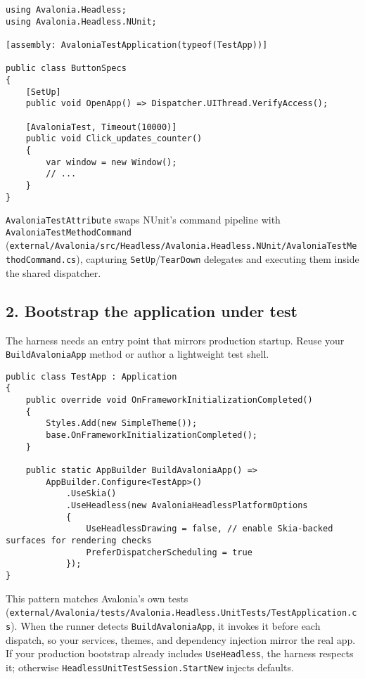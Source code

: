 \begin{lstlisting}
using Avalonia.Headless;
using Avalonia.Headless.NUnit;

[assembly: AvaloniaTestApplication(typeof(TestApp))]

public class ButtonSpecs
{
    [SetUp]
    public void OpenApp() => Dispatcher.UIThread.VerifyAccess();

    [AvaloniaTest, Timeout(10000)]
    public void Click_updates_counter()
    {
        var window = new Window();
        // ...
    }
}
\end{lstlisting}

\passthrough{\lstinline!AvaloniaTestAttribute!} swaps NUnit's command
pipeline with \passthrough{\lstinline!AvaloniaTestMethodCommand!}
(\passthrough{\lstinline!external/Avalonia/src/Headless/Avalonia.Headless.NUnit/AvaloniaTestMethodCommand.cs!}),
capturing
\passthrough{\lstinline!SetUp!}/\passthrough{\lstinline!TearDown!}
delegates and executing them inside the shared dispatcher.

\subsection{2. Bootstrap the application under
test}\label{bootstrap-the-application-under-test}

The harness needs an entry point that mirrors production startup. Reuse
your \passthrough{\lstinline!BuildAvaloniaApp!} method or author a
lightweight test shell.

\begin{lstlisting}
public class TestApp : Application
{
    public override void OnFrameworkInitializationCompleted()
    {
        Styles.Add(new SimpleTheme());
        base.OnFrameworkInitializationCompleted();
    }

    public static AppBuilder BuildAvaloniaApp() =>
        AppBuilder.Configure<TestApp>()
            .UseSkia()
            .UseHeadless(new AvaloniaHeadlessPlatformOptions
            {
                UseHeadlessDrawing = false, // enable Skia-backed surfaces for rendering checks
                PreferDispatcherScheduling = true
            });
}
\end{lstlisting}

This pattern matches Avalonia's own tests
(\passthrough{\lstinline!external/Avalonia/tests/Avalonia.Headless.UnitTests/TestApplication.cs!}).
When the runner detects \passthrough{\lstinline!BuildAvaloniaApp!}, it
invokes it before each dispatch, so your services, themes, and
dependency injection mirror the real app. If your production bootstrap
already includes \passthrough{\lstinline!UseHeadless!}, the harness
respects it; otherwise
\passthrough{\lstinline!HeadlessUnitTestSession.StartNew!} injects
defaults.

